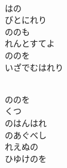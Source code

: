 \documentclass[10pt,b5j]{tarticle} %
\begin{document}
\begin{enumerate}
\begin{minipage}[c]{\blocksize}
    \end{minipage}
    \begin{minipage}[c]{\blocksize}
        
        \vspace{\linespace}
        \item~\\
        はの\\
        びとにれり\\
        ののも\\
        れんとすてよ\\
        ののを\\
        いざでむはれり
        
    \end{minipage}
    \begin{minipage}[c]{\blocksize}
        
        \vspace{\linespace}
        \item~\\
        ののを\\
        くつ\\
        のはんはれ\\
        のあぐべし\\
        れえぬの\\
        ひゆけのを
    
    \end{minipage}
\end{enumerate} %
\end{document}
